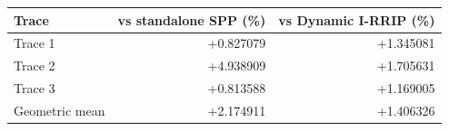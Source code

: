 \begin{tabular}{lrr}
\toprule
Trace & vs standalone SPP (\%) & vs Dynamic I-RRIP (\%) \\
\midrule
Trace 1 & +0.827079 & +1.345081 \\
Trace 2 & +4.938909 & +1.705631 \\
Trace 3 & +0.813588 & +1.169005 \\
Geometric mean & +2.174911 & +1.406326 \\
\bottomrule
\end{tabular}

